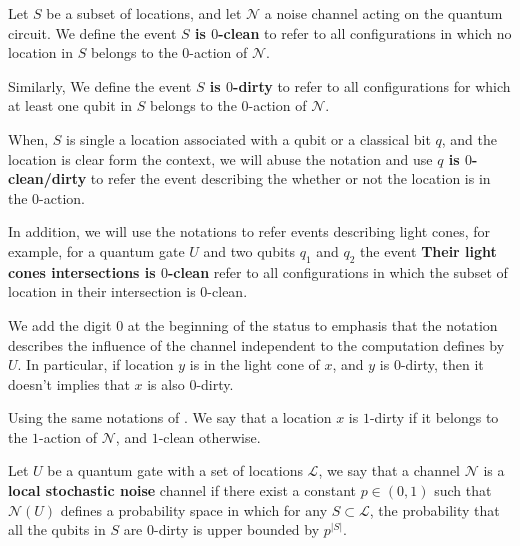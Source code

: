 \begin{definition}
  \label{def:clean_dirty}
  Let $S$ be a subset of locations, and let $\mathcal{N}$ a noise channel acting on the quantum circuit. We define the event \textbf{$S$ is $0$-clean} to refer to all configurations in which no location in $S$ belongs to the $0$-action of  $\mathcal{N}$.

  Similarly, We define the event \textbf{ $S$ is $0$-dirty } to refer to all configurations for which at least one qubit in $S$ belongs to the $0$-action of $\mathcal{N}$.  

  When, $S$ is single a location associated with a qubit or a classical bit $q$, and the location is clear form the context, we will abuse the notation and use \textbf{$q$ is $0$-clean/dirty} to refer the event describing the whether or not the location is in the $0$-action.

  In addition, we will use the notations to refer events describing light cones, for example, for a quantum gate $U$ and two qubits $q_{1}$ and $q_{2}$ the event \textbf{Their light cones intersections is $0$-clean} refer to all configurations in which the subset of location in their intersection is $0$-clean. 
  
\end{definition}

\begin{remark}
  We add the digit $0$ at the beginning of the status to emphasis that the notation describes the influence of the channel independent to the computation defines by $U$. In particular, if location $y$ is in the light cone of $x$, and $y$ is $0$-dirty, then it doesn't implies that $x$ is also $0$-dirty.    
\end{remark}

\begin{definition}
  Using the same notations of . We say that a location $x$ is $1$-dirty if it belongs to the $1$-action of $\mathcal{N}$, and $1$-clean otherwise. 
\end{definition}



\begin{definition}
  Let $U$ be a quantum gate with a set of locations $\mathcal{L}$, we say that a channel $\mathcal{N}$ is a \textbf{local stochastic noise} channel if there exist a constant $p \in (0,1)$ such that $\mathcal{N}(U)$ defines a probability space in which for any $S \subset \mathcal{L}$, the probability that all the qubits in $S$ are $0$-dirty is upper bounded by $p^{|S|}$.
\end{definition}


